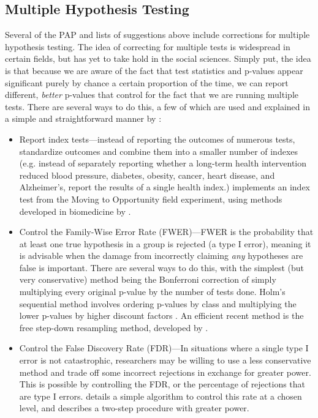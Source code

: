 \documentclass[12pt] {article}
\begin{document}
\subsection{Multiple Hypothesis Testing}
Several of the PAP and lists of suggestions above include corrections for multiple hypothesis testing. The idea of correcting for multiple tests is widespread in certain fields, but has yet to take hold in the social sciences. Simply put, the idea is that because we are aware of the fact that test statistics and p-values appear significant purely by chance a certain proportion of the time, we can report different, \textit{better} p-values that control for the fact that we are running multiple tests. There are several ways to do this, a few of which are used and explained in a simple and straightforward manner by \cite{anderson_fwer}:
\begin{itemize}
\item
Report index tests---instead of reporting the outcomes of numerous tests, standardize outcomes and combine them into a smaller number of indexes (e.g. instead of separately reporting whether a long-term health intervention reduced blood pressure, diabetes, obesity, cancer, heart disease, and Alzheimer's, report the results of a single health index.) \cite{kling2007experimental} implements an index test from the Moving to Opportunity field experiment, using methods developed in biomedicine by \cite{obrien1984procedures}.

\item
Control the Family-Wise Error Rate (FWER)---FWER is the probability that at least one true hypothesis in a group is rejected (a type I error), meaning it is advisable when the damage from incorrectly claiming \textit{any} hypotheses are false is important. There are several ways to do this, with the simplest (but very conservative) method being the Bonferroni correction of simply multiplying every original p-value by the number of tests done. Holm's sequential method involves ordering p-values by class and multiplying the lower p-values by higher discount factors \citep{holm_multipletesting}. An efficient recent method is the free step-down resampling method, developed by \cite{westfall_young_multiple}.
  
\item
Control the False Discovery Rate (FDR)---In situations where a single type I error is not catastrophic, researchers may be willing to use a less conservative method and trade off some incorrect rejections in exchange for greater power. This is possible by controlling the FDR, or the percentage of rejections that are type I errors. \cite{benjamini1995controlling} details a simple algorithm to control this rate at a chosen level, and \cite{benjamini2006adaptive} describes a two-step procedure with greater power. 


\end{itemize}
\end{document}

